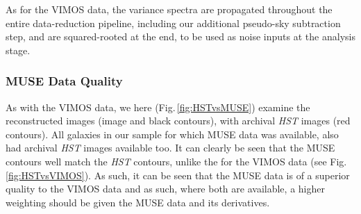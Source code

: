		As for the VIMOS data, the variance spectra are propagated throughout the entire data-reduction pipeline, including our additional pseudo-sky subtraction step, and are squared-rooted at the end, to be used as noise inputs at the analysis stage. 

		\subsubsection{MUSE Data Quality}
			As with the VIMOS data, we here (Fig.\,\ref{fig:HSTvsMUSE}) examine the reconstructed images (image and black contours), with archival \textit{HST} images (red contours). All galaxies in our sample for which MUSE data was available, also had archival \textit{HST} images available too. It can clearly be seen that the MUSE contours well match the \textit{HST} contours, unlike the for the VIMOS data (see Fig.\,\ref{fig:HSTvsVIMOS}). As such, it can be seen that the MUSE data is of a superior quality to the VIMOS data and as such, where both are available, a higher weighting should be given the MUSE data and its derivatives. 

